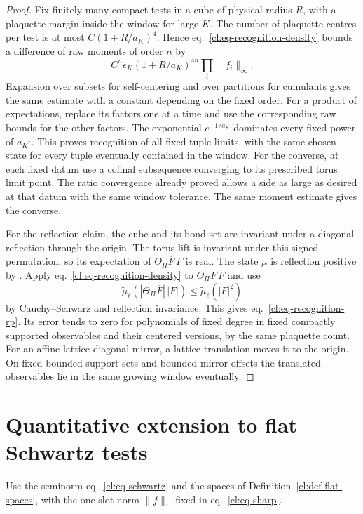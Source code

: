 \documentclass[11pt,letterpaper,reqno]{amsart}
\numberwithin{equation}{section}
\renewcommand{\eqref}[1]{\textup{eq.~\ref{#1}}}
\theoremstyle{definition}
\theoremstyle{remark}
\begin{document}
\begin{proof}
Fix finitely many compact tests in a cube of physical radius
\(R\), with a plaquette margin inside the window for large \(K\).
The number of plaquette centres per test is at most
\(C(1+R/a_K)^4\). Hence \eqref{cl:eq-recognition-density}
bounds a difference of raw moments of order \(n\) by
\[
 C^n\epsilon_K(1+R/a_K)^{4n}\prod_i\|f_i\|_\infty .
\]
Expansion over subsets for self-centering and over partitions
for cumulants gives the same estimate with a constant
depending on the fixed order. For a product of expectations,
replace its factors one at a time and use the corresponding
raw bounds for the other factors. The exponential
\(e^{-1/a_K}\) dominates every fixed power of \(a_K^{-1}\).
This proves recognition of all fixed-tuple limits, with the
same chosen state for every tuple eventually contained in the
window. For the converse, at each fixed datum use a cofinal
subsequence converging to its prescribed torus limit point.
The ratio convergence already proved allows a side as large
as desired at that datum with the same window tolerance.
The same moment estimate gives the converse.

For the reflection claim, the cube and its bond set are
invariant under a diagonal reflection through the origin.
The torus lift is invariant under this signed permutation,
so its expectation of \(\Theta_\Pi\overline F\,F\) is real.
The state \(\mu\) is reflection positive by
\cite[Theorem B]{LP}. Apply \eqref{cl:eq-recognition-density}
to \(\Theta_\Pi\overline F\,F\) and use
\[
 \widetilde\mu_\ell(|\Theta_\Pi\overline F|\,|F|)
 \le \widetilde\mu_\ell(|F|^2)
\]
by Cauchy--Schwarz and reflection invariance. This gives
\eqref{cl:eq-recognition-rp}. Its error tends to zero for
polynomials of fixed degree in fixed compactly supported
observables and their centered versions, by the same
plaquette count. For an affine lattice diagonal mirror,
a lattice translation moves it to the origin. On fixed
bounded support sets and bounded mirror offsets the translated
observables lie in the same growing window eventually.
\end{proof}

\section{Quantitative extension to flat Schwartz tests}
\label{cl:sec-flat-extension}

Use the seminorm \eqref{cl:eq-schwartz} and the spaces of
Definition~\ref{cl:def-flat-spaces}, with the one-slot norm
\(\|f\|_1\) fixed in \eqref{cl:eq-sharp}.
\end{document}
